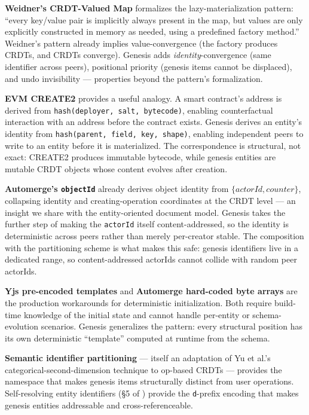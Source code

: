 \textbf{Weidner's CRDT-Valued Map}\cite{weidner2022collab} formalizes the lazy-materialization pattern: ``every key/value pair is implicitly always present in the map, but values are only explicitly constructed in memory as needed, using a predefined factory method.'' Weidner's pattern already implies value-convergence (the factory produces CRDTs, and CRDTs converge). Genesis adds \emph{identity}-convergence (same identifier across peers), positional priority (genesis items cannot be displaced), and undo invisibility --- properties beyond the pattern's formalization.

\textbf{EVM CREATE2}\cite{buterin2018eip1014} provides a useful analogy. A smart contract's address is derived from \texttt{hash(deployer, salt, bytecode)}, enabling counterfactual interaction with an address before the contract exists. Genesis derives an entity's identity from \texttt{hash(parent, field, key, shape)}, enabling independent peers to write to an entity before it is materialized. The correspondence is structural, not exact: CREATE2 produces immutable bytecode, while genesis entities are mutable CRDT objects whose content evolves after creation.

\textbf{Automerge's \texttt{objectId}} already derives object identity from $\{\mathit{actorId}, \mathit{counter}\}$\cite{automerge:modeling, kleppmann2017automerge}, collapsing identity and creating-operation coordinates at the CRDT level --- an insight we share with the entity-oriented document model\cite{plexus:arch}. Genesis takes the further step of making the \texttt{actorId} itself content-addressed, so the identity is deterministic across peers rather than merely per-creator stable. The composition with the partitioning scheme\cite{plexus:partitioning} is what makes this safe: genesis identifiers live in a dedicated range, so content-addressed actorIds cannot collide with random peer actorIds.

\textbf{Yjs pre-encoded templates}\cite{yjs:forum:offlineinit} and \textbf{Automerge hard-coded byte arrays}\cite{automerge:modeling} are the production workarounds for deterministic initialization. Both require build-time knowledge of the initial state and cannot handle per-entity or schema-evolution scenarios. Genesis generalizes the pattern: every structural position has its own deterministic ``template'' computed at runtime from the schema.

\textbf{Semantic identifier partitioning}\cite{plexus:partitioning} --- itself an adaptation of Yu et al.'s categorical-second-dimension technique\cite{yu2019opodis} to op-based CRDTs --- provides the namespace that makes genesis items structurally distinct from user operations. Self-resolving entity identifiers (\S5 of \cite{plexus:arch}) provide the \texttt{d}-prefix encoding that makes genesis entities addressable and cross-referenceable.

